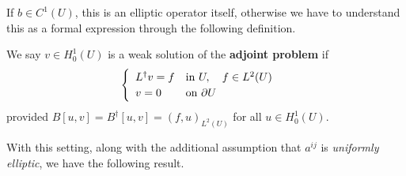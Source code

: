 \documentclass[12pt,a4paper]{report}
\begin{document}
\quad If $b\in C^1(U)$, this is an elliptic operator itself, otherwise we have to understand this as a formal expression through the following definition.
\s

 We say $v\in H_0^1(U)$ is a weak solution of the \textbf{adjoint problem} if
\begin{align*}
\begin{cases}
\begin{array}{ll}
L^{\dagger}v = f & \text{in } U, \quad f\in L^2(U) \\
v = 0 & \text{on } \partial U
\end{array}
\end{cases}
\end{align*}
provided $B[u,v] = B^{\dagger}[u,v] = (f,u)_{L^2(U)}$ for all $u \in H_0^1(U)$.
\s

With this setting, along with the additional assumption that $a^{ij}$ is \emph{uniformly elliptic}, we have the following result. \s
\end{document}
